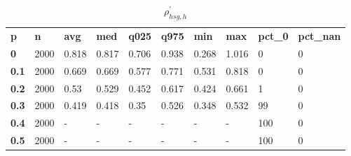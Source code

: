 \begin{table}[h]
 \centering 
\footnotesize
\caption{$\rho_{hsg,h}^\prime $}
\label{tab:alphahsgh}
\begin{tabular}[h]{| l l l l l l l l l l|
    } \hline
\textbf{ p} & \textbf{ n} & \textbf{ avg} & \textbf{ med} & \textbf{ q025} & \textbf{ q975} & \textbf{ min} & \textbf{ max} & \textbf{ pct\_0} & \textbf{ pct\_nan}
           \\
  \textbf{  0} & 2000 & 0.818 & 0.817 & 0.706 & 0.938 & 0.268 & 1.016 &   0 & 0
           \\
  \textbf{0.1} & 2000 & 0.669 & 0.669 & 0.577 & 0.771 & 0.531 & 0.818 &   0 & 0
           \\
  \textbf{0.2} & 2000 &  0.53 & 0.529 & 0.452 & 0.617 & 0.424 & 0.661 &   1 & 0
           \\
  \textbf{0.3} & 2000 & 0.419 & 0.418 &  0.35 & 0.526 & 0.348 & 0.532 &  99 & 0
           \\
  \textbf{0.4} & 2000 & - & - & - & - & - & - & 100 & 0
           \\
  \textbf{0.5} & 2000 & - & - & - & - & - & - & 100 & 0
           \\
 \hline \end{tabular}
 \end{table}
